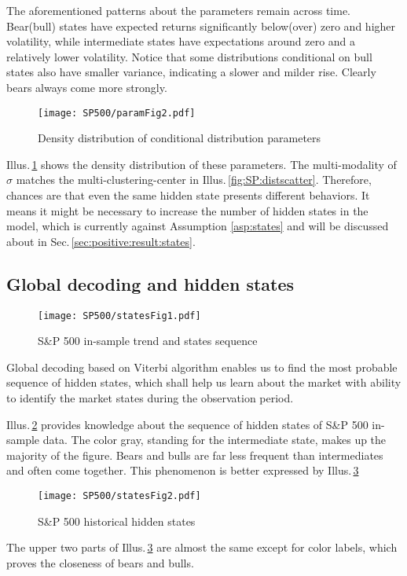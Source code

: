 The aforementioned patterns about the parameters remain across time.
Bear(bull) states have expected returns significantly below(over) zero and higher volatility,
while intermediate states have expectations around zero and a relatively lower volatility.
Notice that some distributions conditional on bull states also have smaller variance,
indicating a slower and milder rise.
Clearly bears always come more strongly.

        \begin{figure}[!hbt]
        \center
        \texttt{[image: SP500/paramFig2.pdf]}
        \caption{Density distribution of conditional distribution parameters}
        \label{fig:SP:distdist}
        \end{figure}
Illus.\,\ref{fig:SP:distdist} shows the density distribution of these parameters.
The multi-modality of $\sigma$ matches the multi-clustering-center in Illus.\,\ref{fig:SP:distscatter}.
Therefore, chances are that even the same hidden state presents different behaviors.
It means it might be necessary to increase the number of hidden states in the model,
which is currently against Assumption \ref{asp:states} and 
will be discussed about in Sec.\,\ref{sec:positive:result:states}.


\subsection{Global decoding and hidden states}
\label{sec:positive:SP:states}

        \begin{figure}[!hbt]
        \center
        \texttt{[image: SP500/statesFig1.pdf]}
        \caption{S\&P 500 in-sample trend and states sequence}
        \label{fig:SP:seqstates}
        \end{figure}
Global decoding based on Viterbi algorithm enables us to find the 
most probable sequence of hidden states,
which shall help us learn about the market with ability to 
identify the market states during the observation period.

Illus.\,\ref{fig:SP:seqstates} provides knowledge about 
the sequence of hidden states of S\&P 500 in-sample data.
The color gray, standing for the intermediate state, 
makes up the majority of the figure.
Bears and bulls are far less frequent than intermediates and often come together.
This phenomenon is better expressed by Illus.\,\ref{fig:SP:states}

        \begin{figure}[!hbt]
        \center
        \texttt{[image: SP500/statesFig2.pdf]}
        \caption{S\&P 500 historical hidden states}
        \label{fig:SP:states}
        \end{figure}
The upper two parts of Illus.\,\ref{fig:SP:states} are almost the same except for color labels,
which proves the closeness of bears and bulls.


